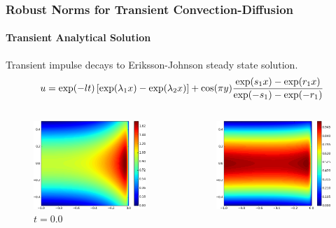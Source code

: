 \documentclass[18pt,xcolor=table]{beamer}
\begin{document}
\begin{frame}[t]
\frametitle{Robust Norms for Transient Convection-Diffusion}
\framesubtitle{Transient Analytical Solution}
Transient impulse decays to Eriksson-Johnson steady state solution.
\[
u=\exp(-lt)\left[ \exp(\lambda_1 x)-\exp(\lambda_2 x) \right]+
\cos(\pi y)\frac{\exp(s_1x)-\exp(r_1x)}{\exp(-s_1)-\exp(-r_1)}
\]
\vspace{-4.0ex}
\begin{columns}[t]
\begin{column}{0.3\textwidth}
\begin{figure}[t]
\centering
\includegraphics[width=\textwidth]{Confusion/Robustness/2d_problem_t_=_00.png}\\
$t=0.0$
\end{figure}
\end{column}
\begin{column}{0.3\textwidth}
\begin{figure}[t]
\centering
\includegraphics[width=\textwidth]{Confusion/Robustness/2d_problem_t_=_05.png}\\

\end{figure}
\end{column}
\end{columns}
\end{frame}
\end{document}
